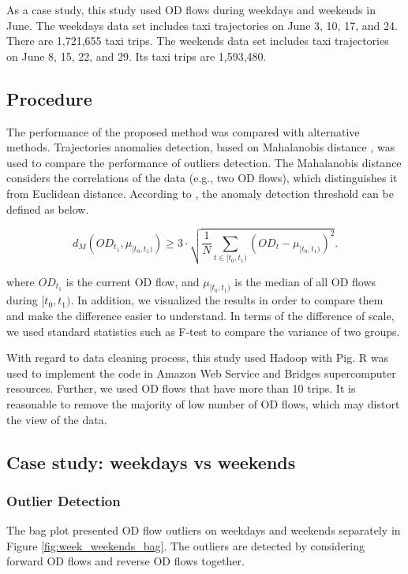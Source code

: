 \documentclass[a4paper,UKenglish]{lipics-v2016}
\begin{document}
As a case study, this study used OD flows during weekdays and weekends in June. The weekdays data set includes taxi trajectories on June 3, 10, 17, and 24. There are 1,721,655 taxi trips. The weekends data set includes taxi trajectories on June 8, 15, 22, and 29.  Its taxi trips are 1,593,480. 

\subsection{Procedure}

The performance of the proposed method was compared with alternative methods. Trajectories anomalies detection, based on Mahalanobis distance \cite{pan13ACMGIS},  was used to compare the performance of outliers detection. The Mahalanobis distance considers the correlations of the data (e.g., two OD flows), which distinguishes it from Euclidean distance. According to \cite{pan13ACMGIS}, the anomaly detection threshold can be defined as below.

\begin{equation*}
d_M(OD_{t_1}, \mu_{[t_0,t_1)}) \geq 3\cdot \sqrt{\frac{1}{N}\sum_{t \in [t_0,t_1)} (OD_{t} - \mu_{[t_0,t_1)})^2} .
\end{equation*}

where $OD_{t_1}$ is the current OD flow, and $\mu_{[t_0,t_1)}$ is the median of all OD flows during $[t_0,t_1)$. In addition, we visualized the results in order to compare them and make the difference easier to understand. In terms of the difference of scale, we used standard statistics such as F-test to compare the variance of two groups.   

With regard to data cleaning process, this study used Hadoop with Pig. R was used to implement the code in Amazon Web Service  and Bridges supercomputer resources. Further, we used OD flows that have more than 10 trips. It is reasonable to remove the majority of low number of OD flows, which may distort the view of the data. 



\subsection{Case study: weekdays vs weekends}
\subsubsection{Outlier Detection}
The bag plot presented OD flow outliers on weekdays and weekends separately in Figure \ref{fig:week_weekends_bag}. The outliers are detected by considering forward OD flows and reverse OD flows together. 
\end{document}
